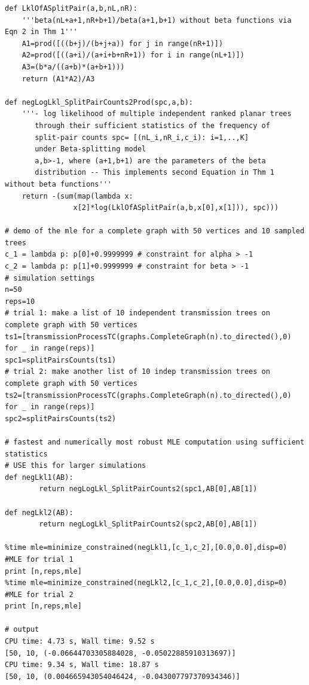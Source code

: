 \documentclass[review]{elsarticle}
\numberwithin{equation}{section}
\begin{document}
{\begin{verbatim}
def LklOfASplitPair(a,b,nL,nR):
    '''beta(nL+a+1,nR+b+1)/beta(a+1,b+1) without beta functions via Eqn 2 in Thm 1'''
    A1=prod([((b+j)/(b+j+a)) for j in range(nR+1)])
    A2=prod([((a+i)/(a+i+b+nR+1)) for i in range(nL+1)])
    A3=(b*a/((a+b)*(a+b+1)))
    return (A1*A2)/A3

def negLogLkl_SplitPairCounts2Prod(spc,a,b):
    '''- log likelihood of multiple independent ranked planar trees
       through their sufficient statistics of the frequency of
       split-pair counts spc= [(nL_i,nR_i,c_i): i=1,..,K]
       under Beta-splitting model
       a,b>-1, where (a+1,b+1) are the parameters of the beta
       distribution -- This implements second Equation in Thm 1 without beta functions'''
    return -(sum(map(lambda x:
                x[2]*log(LklOfASplitPair(a,b,x[0],x[1])), spc)))

# demo of the mle for a complete graph with 50 vertices and 10 sampled trees
c_1 = lambda p: p[0]+0.9999999 # constraint for alpha > -1
c_2 = lambda p: p[1]+0.9999999 # constraint for beta > -1
# simulation settings
n=50
reps=10
# trial 1: make a list of 10 independent transmission trees on complete graph with 50 vertices
ts1=[transmissionProcessTC(graphs.CompleteGraph(n).to_directed(),0)  for _ in range(reps)]
spc1=splitPairsCounts(ts1)
# trial 2: make another list of 10 indep transmission trees on complete graph with 50 vertices
ts2=[transmissionProcessTC(graphs.CompleteGraph(n).to_directed(),0)  for _ in range(reps)]
spc2=splitPairsCounts(ts2)

# fastest and numerically most robust MLE computation using sufficient statistics
# USE this for larger simulations
def negLkl1(AB):
        return negLogLkl_SplitPairCounts2(spc1,AB[0],AB[1])

def negLkl2(AB):
        return negLogLkl_SplitPairCounts2(spc2,AB[0],AB[1])

%time mle=minimize_constrained(negLkl1,[c_1,c_2],[0.0,0.0],disp=0) #MLE for trial 1
print [n,reps,mle]
%time mle=minimize_constrained(negLkl2,[c_1,c_2],[0.0,0.0],disp=0) #MLE for trial 2
print [n,reps,mle]

# output
CPU time: 4.73 s, Wall time: 9.52 s
[50, 10, (-0.06644703305884028, -0.05022885910313697)]
CPU time: 9.34 s, Wall time: 18.87 s
[50, 10, (0.004665943054046424, -0.043007797370934346)]

\end{verbatim}
}
\end{document}
